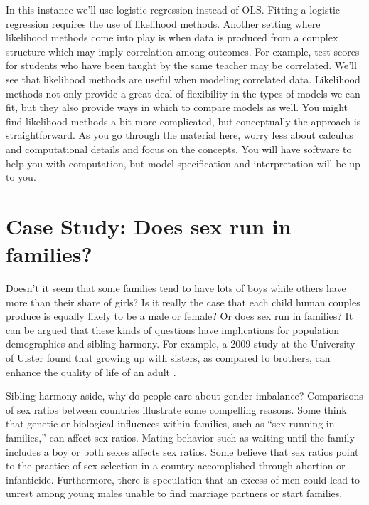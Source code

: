\documentclass[
]{krantz}
\begin{document}
In this instance we'll use logistic regression instead of OLS. Fitting a logistic regression requires the use of likelihood methods. Another setting where likelihood methods come into play is when data is produced from a complex structure which may imply correlation among outcomes. For example, test scores for students who have been taught by the same teacher may be correlated. We'll see that likelihood methods are useful when modeling correlated data. Likelihood methods not only provide a great deal of flexibility in the types of models we can fit, but they also provide ways in which to compare models as well. You might find likelihood methods a bit more complicated, but conceptually the approach is straightforward. As you go through the material here, worry less about calculus and computational details and focus on the concepts. You will have software to help you with computation, but model specification and interpretation will be up to you.

\hypertarget{case-study-does-sex-run-in-families}{%
\section{Case Study: Does sex run in families?}\label{case-study-does-sex-run-in-families}}

Doesn't it seem that some families tend to have lots of boys while others have more than their share of girls? Is it really the case that each child human couples produce is equally likely to be a male or female? Or does sex run in families? It can be argued that these kinds of questions have implications for population demographics and sibling harmony. For example, a 2009 study at the University of Ulster found that growing up with sisters, as compared to brothers, can enhance the quality of life of an adult \citep{BBCNEWS1995}.

Sibling harmony aside, why do people care about gender imbalance? Comparisons of sex ratios between countries illustrate some compelling reasons. Some think that genetic or biological influences within families, such as ``sex running in families,'' can affect sex ratios. Mating behavior such as waiting until the family includes a boy or both sexes affects sex ratios. Some believe that sex ratios point to the practice of sex selection in a country accomplished through abortion or infanticide. Furthermore, there is speculation that an excess of men could lead to unrest among young males unable to find marriage partners or start families.
\end{document}
